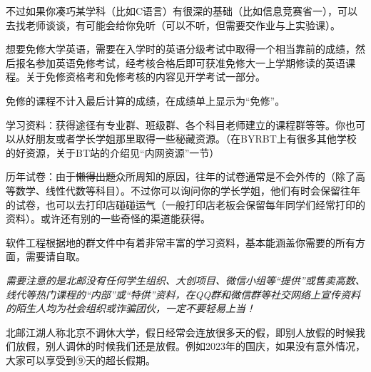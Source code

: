 不过如果你凑巧某学科（比如C语言）有很深的基础（比如信息竞赛省一），可以去找老师谈谈，有可能会给你免听（可以不听，但需要交作业与上实验课）。

想要免修大学英语，需要在入学时的英语分级考试中取得一个相当靠前的成绩，然后报名参加英语免修考试，经考核合格后即可获准免修大一上学期修读的英语课程。关于免修资格考和免修考核的内容见开学考试一部分。

免修的课程不计入最后计算的成绩，在成绩单上显示为“免修”。


学习资料：获得途径有专业群、班级群、各个科目老师建立的课程群等等。你也可以从好朋友或者学长学姐那里取得一些秘藏资源。（在BYRBT上有很多其他学校的好资源，关于BT站的介绍见“内网资源”一节）

历年试卷：由于\sout{懒得出题}众所周知的原因，往年的试卷通常是不会外传的（除了高等数学、线性代数等科目）。不过你可以询问你的学长学姐，他们有时会保留往年的试卷，也可以去打印店碰碰运气（一般打印店老板会保留每年同学们经常打印的资料）。或许还有别的一些奇怪的渠道能获得。

软件工程根据地的群文件中有着非常丰富的学习资料，基本能涵盖你需要的所有方面，需要请自取。

\emph{需要注意的是北邮没有任何学生组织、大创项目、微信小组等“提供”或售卖高数、线代等热门课程的“内部”或“特供”资料，在QQ群和微信群等社交网络上宣传资料的陌生人均为社会组织或诈骗团伙，一定不要轻易上当！}


北邮江湖人称北京不调休大学，假日经常会连放很多天的假，即别人放假的时候我们放假，别人调休的时候我们还是放假。例如2023年的国庆，如果没有意外情况，大家可以享受到⑨天的超长假期。
